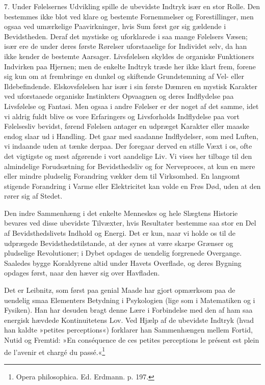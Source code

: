 \documentclass[12pt,a4paper,openany]{book}
\newcommand{\opage}[1]{\marginnote{\footnotesize\textit{[#1]}}}
\begin{document}
7. Under Følelsernes Udvikling spille de ubevidste Indtryk især en stor
Rolle. Den bestemmes ikke blot ved klare og bestemte Fornemmelser og
Forestillinger, men ogsaa ved umærkelige Paavirkninger, hvis Sum først
gør sig gældende i Bevidstheden. Deraf det mystiske og uforklarede i saa
mange Følelsers Væsen; især ere de under deres første Rørelser
uforstaaelige for Individet selv, da han ikke kender de bestemte
Aarsager. Livsfølelsen skyldes de organiske Funktioners Indvirken paa
Hjernen; men de enkelte Indtryk træde her ikke klart frem, forene sig
kun om at frembringe en dunkel og skiftende Grundstemning af Vel- eller
Ildebefindende. Elskovsfølelsen har især i sin første Dæmren en mystisk
Karakter ved uforstaaede organiske Instinkters Opvaagnen og deres
Indflydelse paa Livsfølelse og Fantasi. Men ogsaa i andre Følelser er
der noget af det samme, idet vi aldrig fuldt blive os vore Erfaringers
og Livsforholds Indflydelse paa vort Følelsesliv bevidst, førend
Følelsen antager en udpræget Karakter eller maaske endog slaar ud i
Handling. Det gaar med saadanne Indflydelser, som med Luften, vi
indaande uden at tænke derpaa. Der foregaar derved en stille Væxt i os,
ofte det vigtigste og mest afgørende i vort aandelige Liv. Vi vises her
tilbage til den almindelige Forudsætning for Bevidsthedsliv og for
Nerveproces, at kun en mere eller mindre pludselig Forandring vækker dem
til Virksomhed. En langsomt stigende Forandring i Varme eller
Elektricitet kan volde en Frøs Død, uden at den rører sig af Stedet.


\opage{93}Den indre Sammenhæng i det enkelte Menneskes og hele Slægtens
Historie bevares ved disse ubevidste Tilvæxter, hvis Resultater bestemme
saa stor en Del af Bevidsthedslivets Indhold og Energi. Det er kun, naar
vi holde os til de udprægede Bevidsthedstilstande, at der synes at være
skarpe Grænser og pludselige Revolutioner; i Dybet opdages de uendelig
forgrenede Overgange. Saaledes bygge Koraldyrene altid under Havets
Overflade, og deres Bygning opdages først, naar den hæver sig over
Havfladen.

Det er Leibnitz, som først paa genial Maade har gjort opmærksom paa de
uendelig smaa Elementers Betydning i Psykologien (lige som i Matematiken
og i Fysiken). Han har desuden bragt denne Lære i Forbindelse med den af
ham saa energisk hævdede Kontinuitetens Lov. Ved Hjælp af de ubevidste
Indtryk (hvad han kaldte »petites perceptions«) forklarer han
Sammenhængen mellem Fortid, Nutid og Fremtid: »En conséquence de ces
petites perceptions le présent est plein de l’avenir et chargé du
passé.«\footnote[1]{Opera philosophica. Ed. Erdmann. p. 197.}
\end{document}
